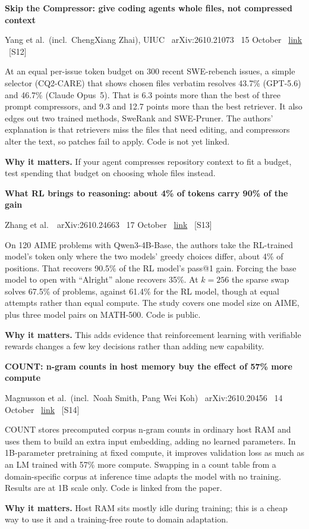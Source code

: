\documentclass[11pt,a4paper]{article}
\newcommand{\entry}[4]{%
  \par\vspace{0.7em}%
  {\sffamily\bfseries\color{brandink}#1}\par
  {\footnotesize\color{brandgrey}#2 \textbullet\ \href{#3}{link} \textbullet\ \srcref{#4}}\par
  \vspace{0.15em}}
\newcommand{\why}[1]{\par{\small\textbf{Why it matters.} #1}\par}
\newcommand{\srcref}[1]{\textcolor{brandaccent}{[S#1]}}
\begin{document}
\entry{Skip the Compressor: give coding agents whole files, not compressed context}{Yang et al.\ (incl.\ ChengXiang Zhai), UIUC \textbullet\ arXiv:2610.21073 \textbullet\ 15 October}{https://arxiv.org/abs/2610.21073}{12}
At an equal per-issue token budget on 300 recent SWE-rebench issues, a simple selector (CQ2-CARE) that shows chosen
files verbatim resolves 43.7\% (GPT-5.6) and 46.7\% (Claude Opus~5). That is 6.3 points more than the best of
three prompt compressors, and 9.3 and 12.7 points more than the best retriever. It also edges out two trained methods, SweRank
and SWE-Pruner. The authors' explanation is that retrievers miss the files that need editing, and compressors alter the
text, so patches fail to apply. Code is not yet linked.
\why{If your agent compresses repository context to fit a budget, test spending that budget on choosing whole files instead.}

\entry{What RL brings to reasoning: about 4\% of tokens carry 90\% of the gain}{Zhang et al.\ \textbullet\ arXiv:2610.24663 \textbullet\ 17 October}{https://arxiv.org/abs/2610.24663}{13}
On 120 AIME problems with Qwen3-4B-Base, the authors take the RL-trained model's token only where the two models' greedy choices
differ, about 4\% of positions. That recovers 90.5\% of the RL model's pass@1 gain. Forcing the base model to open
with ``Alright'' alone recovers 35\%. At $k{=}256$ the sparse swap solves 67.5\% of problems, against 61.4\% for the RL model,
though at equal attempts rather than equal compute. The study covers one model size on AIME, plus three model pairs on MATH-500. Code is public.
\why{This adds evidence that reinforcement learning with verifiable rewards changes a few key decisions rather than adding new capability.}

\entry{COUNT: n-gram counts in host memory buy the effect of 57\% more compute}{Magnusson et al.\ (incl.\ Noah Smith, Pang Wei Koh) \textbullet\ arXiv:2610.20456 \textbullet\ 14 October}{https://arxiv.org/abs/2610.20456}{14}
COUNT stores precomputed corpus n-gram counts in ordinary host RAM and uses them to build an extra input embedding,
adding no learned parameters. In 1B-parameter pretraining at fixed compute, it improves validation loss as much as an
LM trained with 57\% more compute. Swapping in a count table from a domain-specific corpus at inference time adapts the model with no training.
Results are at 1B scale only. Code is linked from the paper.
\why{Host RAM sits mostly idle during training; this is a cheap way to use it and a training-free route to domain adaptation.}
\end{document}

